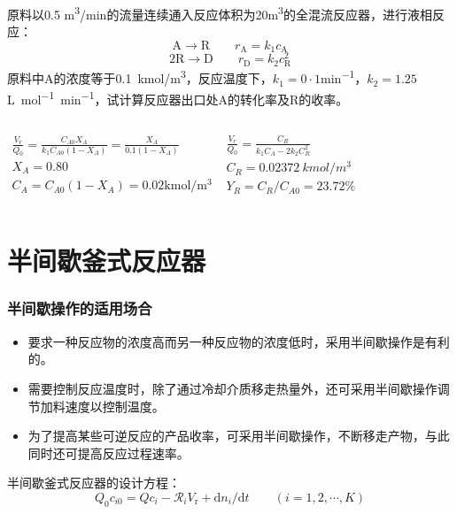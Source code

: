 \documentclass[dvipsnames, svgnames, x11names]{beamer}
\begin{document}
\begin{frame}[t]
    \frametitle{}

    \begin{example}
        原料以0.5 \si{m^3/min}的流量连续通入反应体积为20\si{m^3}的全混流反应器，进行液相反应：
        \[
        \mathrm{A} \longrightarrow \mathrm{R} \qquad r_{\mathrm{A}}=k_{1} c_{\mathrm{A}}
        \]
        \[
        \mathrm{2R} \longrightarrow \mathrm{D} \qquad r_{\mathrm{D}}=k_{2} c_{\mathrm{R}}^2
        \]    
        原料中A的浓度等于\SI{0.1}{kmol/m^3}，反应温度下，$k_1=0·1$\si{min^{-1}}，$k_2=1.25$\si{L.mol^{-1}.min^{-1}}，试计算反应器出口处A的转化率及R的收率。
    \end{example}\pause
    \begin{columns}[c]
        \column{7.5cm}
        \large $\begin{array}{l}
        \frac{V_{r}}{Q_{0}}=\frac{C_{A 0} X_{A}}{k_{1} C_{A 0}(1-X_{A})}=\frac{X_{A}}{0.1(1-X_{A})}\\
    
        X_{A}=0.80\\
        
        C_{A}=C_{A 0}(1-X_{A})=0.02  \mathrm{kmol} / \mathrm{m}^{3}  
    \end{array}$
        \column{6cm}
        \large $\begin{array}{l}
            \frac{V_{r}}{Q_{0}}=\frac{C_{R}}{k_{1} C_{A}-2 k_{2} C_{R}^{2}}\\
        
            C_{R}= \SI{0.02372}{kmol/m^3}\\
        
            Y_{R}={C_{R}}/{C_{A 0}}=23.72\%
        \end{array}$
    \end{columns}

\end{frame}


\section{半间歇釜式反应器}


\begin{frame}
    \frametitle{半间歇操作的适用场合}

    \large \begin{itemize}
        \item 要求一种反应物的浓度高而另一种反应物的浓度低时，采用半间歇操作是有利的。
        \item 需要控制反应温度时，除了通过冷却介质移走热量外，还可采用半间歇操作调节加料速度以控制温度。
        \item 为了提高某些可逆反应的产品收率，可采用半间歇操作，不断移走产物，与此同时还可提高反应过程速率。
    \end{itemize}
    半间歇釜式反应器的设计方程：
    \[
        Q_0c_{i0}=Qc_{i}-\mathcal{R}_iV_\mathrm{r}+\mathrm{d}n_i/\mathrm{d}t \qquad (i=1,2,\cdots,K)
    \]
\end{frame}
\end{document}
